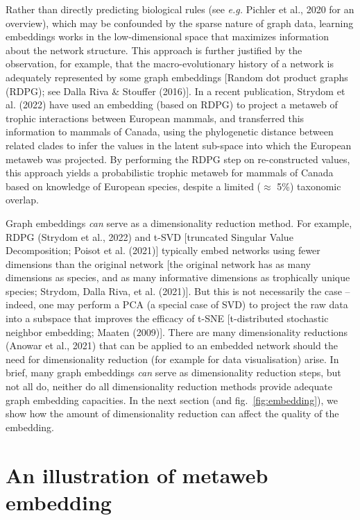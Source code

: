 \documentclass[11pt]{article}
\begin{document}
Rather than directly predicting biological rules (see \emph{e.g.}
Pichler et al., 2020 for an overview), which may be confounded by the
sparse nature of graph data, learning embeddings works in the
low-dimensional space that maximizes information about the network
structure. This approach is further justified by the observation, for
example, that the macro-evolutionary history of a network is adequately
represented by some graph embeddings {[}Random dot product graphs
(RDPG); see Dalla Riva \& Stouffer (2016){]}. In a recent publication,
Strydom et al. (2022) have used an embedding (based on RDPG) to project
a metaweb of trophic interactions between European mammals, and
transferred this information to mammals of Canada, using the
phylogenetic distance between related clades to infer the values in the
latent sub-space into which the European metaweb was projected. By
performing the RDPG step on re-constructed values, this approach yields
a probabilistic trophic metaweb for mammals of Canada based on knowledge
of European species, despite a limited (\(\approx\) 5\%) taxonomic
overlap.

Graph embeddings \emph{can} serve as a dimensionality reduction method.
For example, RDPG (Strydom et al., 2022) and t-SVD {[}truncated Singular
Value Decomposition; Poisot et al. (2021){]} typically embed networks
using fewer dimensions than the original network {[}the original network
has as many dimensions as species, and as many informative dimensions as
trophically unique species; Strydom, Dalla Riva, et al. (2021){]}. But
this is not necessarily the case -- indeed, one may perform a PCA (a
special case of SVD) to project the raw data into a subspace that
improves the efficacy of t-SNE {[}t-distributed stochastic neighbor
embedding; Maaten (2009){]}. There are many dimensionality reductions
(Anowar et al., 2021) that can be applied to an embedded network should
the need for dimensionality reduction (for example for data
visualisation) arise. In brief, many graph embeddings \emph{can} serve
as dimensionality reduction steps, but not all do, neither do all
dimensionality reduction methods provide adequate graph embedding
capacities. In the next section (and fig.~\ref{fig:embedding}), we show
how the amount of dimensionality reduction can affect the quality of the
embedding.

\hypertarget{an-illustration-of-metaweb-embedding}{%
\section{An illustration of metaweb
embedding}\label{an-illustration-of-metaweb-embedding}}
\end{document}
